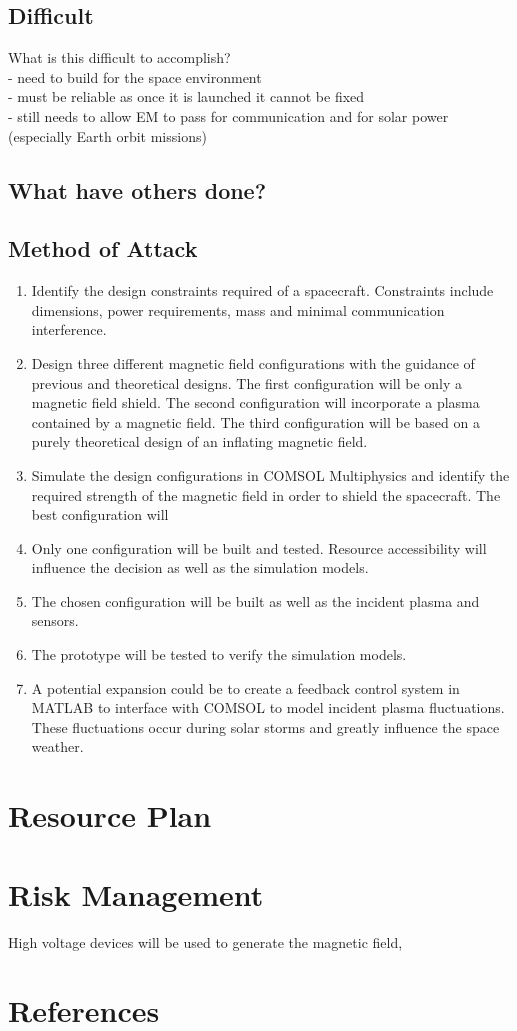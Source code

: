 \documentclass[12pt,a4paper]{article}
\begin{document}
\subsection{Difficult}
What is this difficult to accomplish?\\
- need to build for the space environment\\
- must be reliable as once it is launched it cannot be fixed\\
- still needs to allow EM to pass for communication and for solar power (especially Earth orbit missions)

\subsection{What have others done?}



\subsection{Method of Attack}
\begin{enumerate}
\item Identify the design constraints required of a spacecraft. Constraints include dimensions, power requirements, mass and minimal communication interference.
\item Design three different magnetic field configurations with the guidance of previous and theoretical designs. The first configuration will be only a magnetic field shield. The second configuration will incorporate a plasma contained by a magnetic field. The third configuration will be based on a purely theoretical design of an inflating magnetic field.
\item Simulate the design configurations in COMSOL Multiphysics and identify the required strength of the magnetic field in order to shield the spacecraft. The best configuration will
\item Only one configuration will be built and tested. Resource accessibility will influence the decision as well as the simulation models.
\item The chosen configuration will be built as well as the incident plasma and sensors.
\item The prototype will be tested to verify the simulation models.
\item A potential expansion could be to create a feedback control system in MATLAB to interface with COMSOL to model incident plasma fluctuations. These fluctuations occur during solar storms and greatly influence the space weather.  
\end{enumerate}


\section{Resource Plan}



\section{Risk Management}
High voltage devices will be used to generate the magnetic field, 





\section{References}


{}

\end{document}
